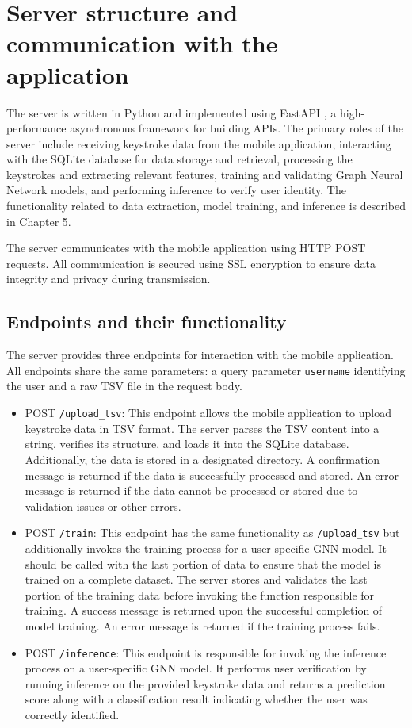 \section{Server structure and communication with the application}
The server is written in Python and implemented using FastAPI \cite{fastapi}, a high-performance asynchronous framework for building APIs. The primary roles of the server include receiving keystroke data from the mobile application, interacting with the SQLite database for data storage and retrieval, processing the keystrokes and extracting relevant features, training and validating Graph Neural Network models, and performing inference to verify user identity. The functionality related to data extraction, model training, and inference is described in Chapter 5.

The server communicates with the mobile application using HTTP POST requests. All communication is secured using SSL encryption to ensure data integrity and privacy during transmission.

\subsection{Endpoints and their functionality}
The server provides three endpoints for interaction with the mobile application. All endpoints share the same parameters: a query parameter \texttt{username} identifying the user and a raw TSV file in the request body.
\begin{itemize}
    \item POST \texttt{/upload\_tsv}: This endpoint allows the mobile application to upload keystroke data in TSV format. The server parses the TSV content into a string, verifies its structure, and loads it into the SQLite database. Additionally, the data is stored in a designated directory. A confirmation message is returned if the data is successfully processed and stored. An error message is returned if the data cannot be processed or stored due to validation issues or other errors.
    \item POST \texttt{/train}: This endpoint has the same functionality as \texttt{/upload\_tsv} but additionally invokes the training process for a user-specific GNN model. It should be called with the last portion of data to ensure that the model is trained on a complete dataset. The server stores and validates the last portion of the training data before invoking the function responsible for training. A success message is returned upon the successful completion of model training. An error message is returned if the training process fails.
    \item POST \texttt{/inference}: This endpoint is responsible for invoking the inference process on a user-specific GNN model. It performs user verification by running inference on the provided keystroke data and returns a prediction score along with a classification result indicating whether the user was correctly identified.
\end{itemize}

